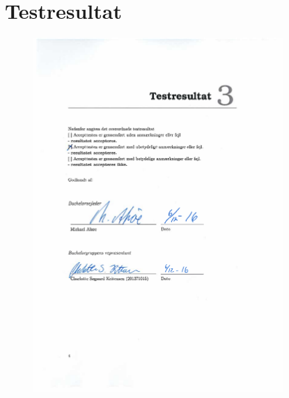 \chapter{Testresultat}\label{Testrusultat}
\begin{figure}[H]
    \centering
    \includegraphics[width=0.85\textwidth]{afiler/Underskrift_Accettest}
    \label{underskrift_at}
\end{figure}